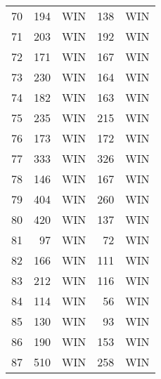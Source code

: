 \begin{tabular}{rrrrr}
        70 &        194 &        WIN &        138 &        WIN \\

        71 &        203 &        WIN &        192 &        WIN \\

        72 &        171 &        WIN &        167 &        WIN \\

        73 &        230 &        WIN &        164 &        WIN \\

        74 &        182 &        WIN &        163 &        WIN \\

        75 &        235 &        WIN &        215 &        WIN \\

        76 &        173 &        WIN &        172 &        WIN \\

        77 &        333 &        WIN &        326 &        WIN \\

        78 &        146 &        WIN &        167 &        WIN \\

        79 &        404 &        WIN &        260 &        WIN \\

        80 &        420 &        WIN &        137 &        WIN \\

        81 &         97 &        WIN &         72 &        WIN \\

        82 &        166 &        WIN &        111 &        WIN \\

        83 &        212 &        WIN &        116 &        WIN \\

        84 &        114 &        WIN &         56 &        WIN \\

        85 &        130 &        WIN &         93 &        WIN \\

        86 &        190 &        WIN &        153 &        WIN \\

        87 &        510 &        WIN &        258 &        WIN \\


\end{tabular}
